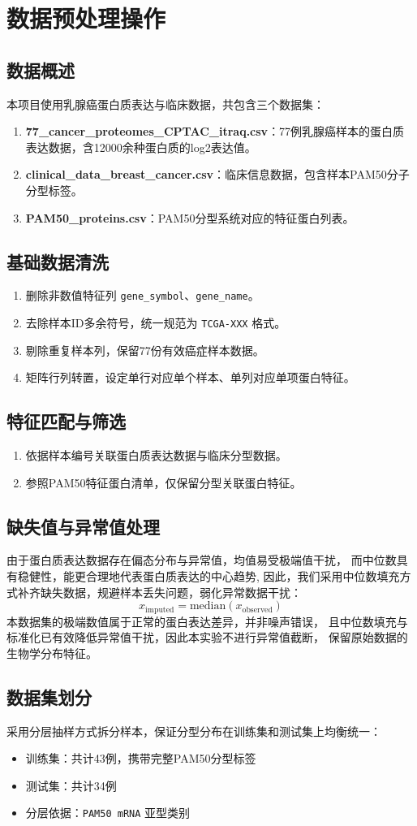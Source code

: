 \section{数据预处理操作}
\label{sec:preprocessing}

\subsection{数据概述}
本项目使用乳腺癌蛋白质表达与临床数据，共包含三个数据集：
\begin{enumerate}
    \item \textbf{77\_cancer\_proteomes\_CPTAC\_itraq.csv}：77例乳腺癌样本的蛋白质表达数据，含12000余种蛋白质的log2表达值。
    \item \textbf{clinical\_data\_breast\_cancer.csv}：临床信息数据，包含样本PAM50分子分型标签。
    \item \textbf{PAM50\_proteins.csv}：PAM50分型系统对应的特征蛋白列表。
\end{enumerate}

\subsection{基础数据清洗}
\begin{enumerate}
    \item 删除非数值特征列 \texttt{gene\_symbol}、\texttt{gene\_name}。
    \item 去除样本ID多余符号，统一规范为 \texttt{TCGA-XXX} 格式。
    \item 剔除重复样本列，保留77份有效癌症样本数据。
    \item 矩阵行列转置，设定单行对应单个样本、单列对应单项蛋白特征。
\end{enumerate}

\subsection{特征匹配与筛选}
\begin{enumerate}
    \item 依据样本编号关联蛋白质表达数据与临床分型数据。
    \item 参照PAM50特征蛋白清单，仅保留分型关联蛋白特征。
\end{enumerate}

\subsection{缺失值与异常值处理}
由于蛋白质表达数据存在偏态分布与异常值，均值易受极端值干扰，
而中位数具有稳健性，能更合理地代表蛋白质表达的中心趋势,
因此，我们采用中位数填充方式补齐缺失数据，规避样本丢失问题，弱化异常数据干扰：
\[
x_{\text{imputed}} = \text{median}(x_{\text{observed}})
\]
本数据集的极端数值属于正常的蛋白表达差异，并非噪声错误，
且中位数填充与标准化已有效降低异常值干扰，因此本实验不进行异常值截断，
保留原始数据的生物学分布特征。


\subsection{数据集划分}
采用分层抽样方式拆分样本，保证分型分布在训练集和测试集上均衡统一：
\begin{itemize}
    \item 训练集：共计43例，携带完整PAM50分型标签
    \item 测试集：共计34例
    \item 分层依据：\texttt{PAM50 mRNA} 亚型类别
\end{itemize}

